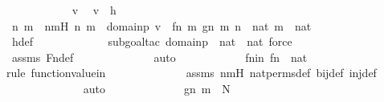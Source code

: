 \begin{isabellebody}
\ \ \ \ \ \ \ \ \ \ \isamarkupfalse%
\ v\ \isamarkupfalse%
\ {\isachardoublequoteopen}v\ {\isasymin}\ h{\isachardoublequoteclose}\ \isanewline
\ \ \ \ \ \ \ \ \ \ \isamarkupfalse%
\ \isamarkupfalse%
\ n\ m\ \ nmH{\isacharcolon}{\kern0pt}\ {\isachardoublequoteopen}{\isacharless}{\kern0pt}n{\isacharcomma}{\kern0pt}\ m{\isachargreater}{\kern0pt}\ {\isasymin}\ domain{\isacharparenleft}{\kern0pt}p{\isacharparenright}{\kern0pt}{\isachardoublequoteclose}\ {\isachardoublequoteopen}v\ {\isacharequal}{\kern0pt}\ {\isacharless}{\kern0pt}{\isacharless}{\kern0pt}f{\isacharbackquote}{\kern0pt}n{\isacharcomma}{\kern0pt}\ m{\isachargreater}{\kern0pt}{\isacharcomma}{\kern0pt}\ g{\isacharbackquote}{\kern0pt}{\isacharless}{\kern0pt}n{\isacharcomma}{\kern0pt}\ m{\isachargreater}{\kern0pt}{\isachargreater}{\kern0pt}{\isachardoublequoteclose}\ {\isachardoublequoteopen}n\ {\isasymin}\ nat{\isachardoublequoteclose}\ {\isachardoublequoteopen}m\ {\isasymin}\ nat{\isachardoublequoteclose}\ \ \isanewline
\ \ \ \ \ \ \ \ \ \ \ \ \isamarkupfalse%
\ h{\isacharunderscore}{\kern0pt}def\isanewline
\ \ \ \ \ \ \ \ \ \ \ \ \isamarkupfalse%
{\isacharparenleft}{\kern0pt}subgoal{\isacharunderscore}{\kern0pt}tac\ {\isachardoublequoteopen}domain{\isacharparenleft}{\kern0pt}p{\isacharparenright}{\kern0pt}\ {\isasymsubseteq}\ nat\ {\isasymtimes}\ nat{\isachardoublequoteclose}{\isacharcomma}{\kern0pt}\ force{\isacharparenright}{\kern0pt}\isanewline
\ \ \ \ \ \ \ \ \ \ \ \ \isamarkupfalse%
\ assms\ Fn{\isacharunderscore}{\kern0pt}def\isanewline
\ \ \ \ \ \ \ \ \ \ \ \ \isamarkupfalse%
\ auto\isanewline
\ \ \ \ \ \ \ \ \ \ \isamarkupfalse%
\ fnin{\isacharcolon}{\kern0pt}\ {\isachardoublequoteopen}f{\isacharbackquote}{\kern0pt}n\ {\isasymin}\ nat{\isachardoublequoteclose}\ \isanewline
\ \ \ \ \ \ \ \ \ \ \ \ \isamarkupfalse%
{\isacharparenleft}{\kern0pt}rule\ function{\isacharunderscore}{\kern0pt}value{\isacharunderscore}{\kern0pt}in{\isacharparenright}{\kern0pt}\isanewline
\ \ \ \ \ \ \ \ \ \ \ \ \isamarkupfalse%
\ assms\ nmH\ nat{\isacharunderscore}{\kern0pt}perms{\isacharunderscore}{\kern0pt}def\ bij{\isacharunderscore}{\kern0pt}def\ inj{\isacharunderscore}{\kern0pt}def\ \isanewline
\ \ \ \ \ \ \ \ \ \ \ \ \isamarkupfalse%
\ auto\isanewline
\ \ \ \ \ \ \ \ \ \ \isamarkupfalse%
\ \isamarkupfalse%
\ {\isachardoublequoteopen}g{\isacharbackquote}{\kern0pt}{\isacharless}{\kern0pt}n{\isacharcomma}{\kern0pt}\ m{\isachargreater}{\kern0pt}\ {\isasymin}\ N{\isachardoublequoteclose}\ \isanewline

\end{isabellebody}
